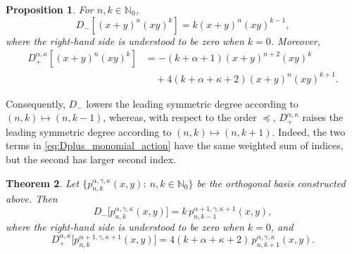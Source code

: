 \documentclass[reqno,10pt]{amsart}
\theoremstyle{plain}
\newtheorem{theorem}{Theorem}[section]
\newtheorem{proposition}[theorem]{Proposition}
\numberwithin{equation}{section}
\numberwithin{figure}{section}
\begin{document}
\begin{proposition}\label{prop:D_ladder_monomial_action}
For $n,k\in\mathbb{N}_0$,
\begin{equation*}%
D_{-}\left[(x+y)^n(xy)^k\right]
=
k(x+y)^n(xy)^{k-1},
\end{equation*}
where the right-hand side is understood to be zero when $k=0$. Moreover,
\begin{equation}\label{eq:Dplus_monomial_action}
\begin{aligned}
D_{+}^{\alpha,\kappa}
\left[(x+y)^n(xy)^k\right]
&=
-(k+\alpha+1)(x+y)^{n+2}(xy)^k
\\
&\quad
+
4(k+\alpha+\kappa+2)(x+y)^n(xy)^{k+1}.
\end{aligned}
\end{equation}
\end{proposition}

Consequently, $D_{-}$ lowers the leading symmetric degree according to $(n,k)\mapsto(n,k-1)$, whereas, with respect to the order $\preceq$, $D_{+}^{\alpha,\kappa}$
raises the leading symmetric degree according to $(n,k)\mapsto(n,k+1)$. Indeed, the two terms in \eqref{eq:Dplus_monomial_action} have the same
weighted sum of indices, but the second has larger second index.

\begin{theorem}\label{th:ladderD_agk}
Let $\{p_{n,k}^{\alpha,\gamma,\kappa}(x,y):\ n,k\in\mathbb{N}_0\}$ be the orthogonal basis constructed above. Then
\[
D_{-}\big[p_{n,k}^{\alpha,\gamma,\kappa}(x,y)\big]
=
k\,p_{n,k-1}^{\alpha+1,\gamma,\kappa+1}(x,y),
\]
where the right-hand side is understood to be zero when $k=0$, and
\[
D_{+}^{\alpha,\kappa}
\big[p_{n,k}^{\alpha+1,\gamma,\kappa+1}(x,y)\big]
=
4(k+\alpha+\kappa+2)\,
p_{n,k+1}^{\alpha,\gamma,\kappa}(x,y).
\]
\end{theorem}
\end{document}
